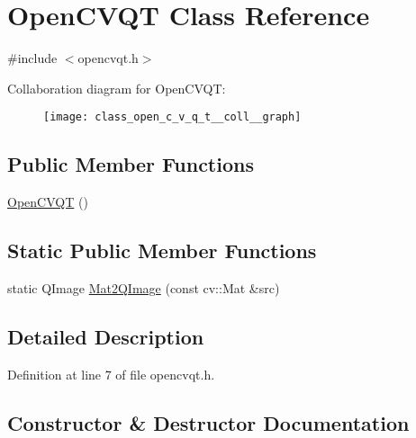 \hypertarget{class_open_c_v_q_t}{}\section{Open\+C\+V\+Q\+T Class Reference}
\label{class_open_c_v_q_t}


{\ttfamily \#include $<$opencvqt.\+h$>$}



Collaboration diagram for Open\+C\+V\+Q\+T\+:\nopagebreak
\begin{figure}[H]
\begin{center}
\leavevmode
\texttt{[image: class\_open\_c\_v\_q\_t\_\_coll\_\_graph]}
\end{center}
\end{figure}
\subsection*{Public Member Functions}
\begin{DoxyCompactItemize}
\item 
\hyperlink{class_open_c_v_q_t_a34d38b2b4394ced620283754a881bbe3}{Open\+C\+V\+Q\+T} ()
\end{DoxyCompactItemize}
\subsection*{Static Public Member Functions}
\begin{DoxyCompactItemize}
\item 
static Q\+Image \hyperlink{class_open_c_v_q_t_aed2deb7932b122f110cb651747d6d81b}{Mat2\+Q\+Image} (const cv\+::\+Mat \&src)
\end{DoxyCompactItemize}


\subsection{Detailed Description}


Definition at line 7 of file opencvqt.\+h.



\subsection{Constructor \& Destructor Documentation}
\hypertarget{class_open_c_v_q_t_a34d38b2b4394ced620283754a881bbe3}{}

